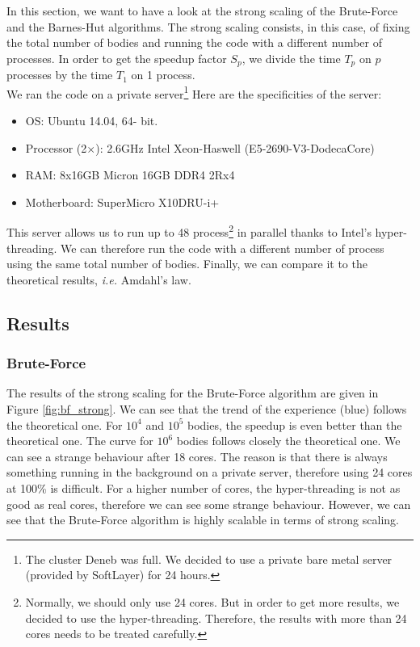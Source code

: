 \documentclass[10pt,a4paper]{article}
\begin{document}
In this section, we want to have a look at the strong scaling of the Brute-Force and the Barnes-Hut algorithms. The strong scaling consists, in this case, of fixing the total number of bodies and running the code with a different number of processes. In order to get the speedup factor $S_p$, we divide the time $T_p$ on $p$ processes by the time $T_1$ on 1 process.
\\
We ran the code on a private server\footnote{The cluster Deneb was full. We decided to use a private bare metal server (provided by SoftLayer) for 24 hours.} Here are the specificities of the server:
\begin{itemize}
\item OS: Ubuntu 14.04, 64- bit.
\item Processor (2$\times$): 2.6GHz Intel Xeon-Haswell (E5-2690-V3-DodecaCore)
\item RAM: 8x16GB Micron 16GB DDR4 2Rx4
\item Motherboard: SuperMicro X10DRU-i+
\end{itemize}
This server allows us to run up to 48 process\footnote{Normally, we should only use 24 cores. But in order to get more results, we decided to use the hyper-threading. Therefore, the results with more than 24 cores needs to be treated carefully.} in parallel thanks to Intel's hyper-threading. We can therefore run the code with a different number of process using the same total number of bodies. Finally, we can compare it to the theoretical results, {\it i.e.} Amdahl's law. 

\subsection{Results}

\subsubsection{Brute-Force}

The results of the strong scaling for the Brute-Force algorithm are given in Figure \ref{fig:bf_strong}. We can see that the trend of the experience (blue) follows the theoretical one. For $10^4$ and $10^5$ bodies, the speedup is even better than the theoretical one. The curve for $10^6$ bodies follows closely the theoretical one. We can see a strange behaviour after 18 cores. The reason is that there is always something running in the background on a private server, therefore using 24 cores at 100\% is difficult. For a higher number of cores, the hyper-threading is not as good as real cores, therefore we can see some strange behaviour. However, we can see that the Brute-Force algorithm is highly scalable in terms of strong scaling.
\end{document}
